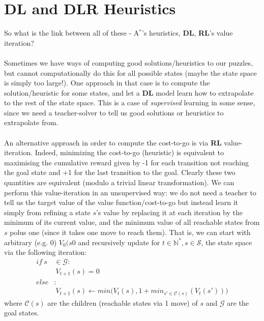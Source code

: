 \section{DL and DLR Heuristics}

So what is the link between all of these - A$^{*}$'s heuristics, \textbf{DL}, \textbf{RL}'s value iteration?
\\
\\
Sometimes we have ways of computing good solutions/heuristics to our puzzles, but cannot computationally do this for all possible states (maybe the state space is simply too large!). One approach in that case is to compute the solution/heuristic for some states, and let a \textbf{DL} model learn how to extrapolate to the rest of the state space. This is a case of \textit{supervised} learning in some sense, since we need a teacher-solver to tell us good solutions or heuristics to extrapolate from.
\\
\\
An alternative approach in order to compute the cost-to-go is via \textbf{RL} value-iteration. Indeed, minimizing the cost-to-go (heuristic) is equivalent to maximising the cumulative reward given by -1 for each transition not reaching the goal state and +1 for the last transition to the goal. Clearly these two quantities are equivalent (modulo a trivial linear transformation). We can perform this value-iteration in an unsupervised way: we do not need a teacher to tell us the target value of the value function/cost-to-go but instead learn it simply from refining a state $s$'s value by replacing it at each iteration by the minimum of its current value, and the minimum value of all reachable states from $s$ polus one (since it takes one move to reach them). That is, we can start with arbitrary (e.g. 0) $V_{0}(s0$ and recursively update for $t \in \mathbb{N}^{*}, s \in \mathcal{S}$, the state space via the following iteration:
\begin{equation} \label{eq:DLVI}
\begin{split}
if \  s & \in \mathcal{G}: \\
& \ V_{t+1}(s) = 0 \\
else&: \\
& \ V_{t+1}(s) \leftarrow min \Big( V_{t}(s), 1 + min_{s' \in \mathcal{C}(s)}(V_{t}(s'))  \Big)
\end{split}
\end{equation}
where $\mathcal{C}(s)$ are the children (reachable states via 1 move) of $s$ and $\mathcal{G}$ are the goal states.
\\
